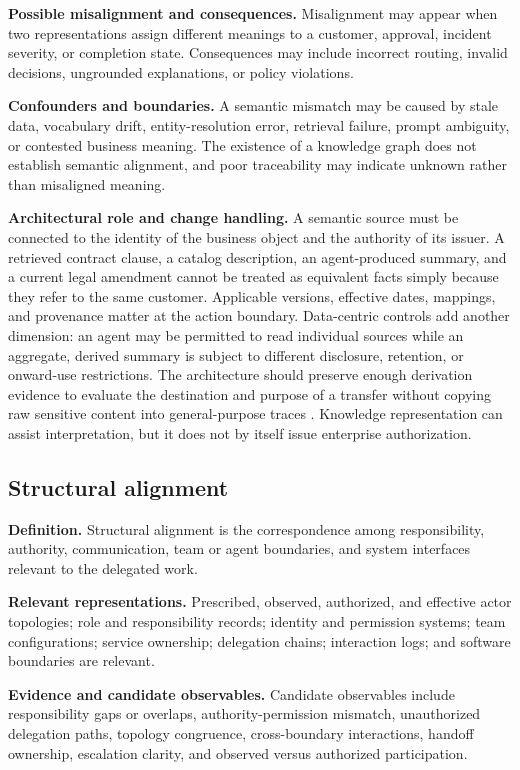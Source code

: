 \documentclass[11pt,letterpaper]{article}
\newcommand{\parencite}[1]{\citep{#1}}
\begin{document}
\textbf{Possible misalignment and consequences.} Misalignment may appear when two representations assign different meanings to a customer, approval, incident severity, or completion state. Consequences may include incorrect routing, invalid decisions, ungrounded explanations, or policy violations.

\textbf{Confounders and boundaries.} A semantic mismatch may be caused by stale data, vocabulary drift, entity-resolution error, retrieval failure, prompt ambiguity, or contested business meaning. The existence of a knowledge graph does not establish semantic alignment, and poor traceability may indicate unknown rather than misaligned meaning.

\textbf{Architectural role and change handling.} A semantic source must be connected to the identity of the business object and the authority of its issuer. A retrieved contract clause, a catalog description, an agent-produced summary, and a current legal amendment cannot be treated as equivalent facts simply because they refer to the same customer. Applicable versions, effective dates, mappings, and provenance matter at the action boundary. Data-centric controls add another dimension: an agent may be permitted to read individual sources while an aggregate, derived summary is subject to different disclosure, retention, or onward-use restrictions. The architecture should preserve enough derivation evidence to evaluate the destination and purpose of a transfer without copying raw sensitive content into general-purpose traces \parencite{w3c2013prov,tallam2026authorization}. Knowledge representation can assist interpretation, but it does not by itself issue enterprise authorization.

\subsection{Structural alignment}
\textbf{Definition.} Structural alignment is the correspondence among responsibility, authority, communication, team or agent boundaries, and system interfaces relevant to the delegated work.

\textbf{Relevant representations.} Prescribed, observed, authorized, and effective actor topologies; role and responsibility records; identity and permission systems; team configurations; service ownership; delegation chains; interaction logs; and software boundaries are relevant.

\textbf{Evidence and candidate observables.} Candidate observables include responsibility gaps or overlaps, authority-permission mismatch, unauthorized delegation paths, topology congruence, cross-boundary interactions, handoff ownership, escalation clarity, and observed versus authorized participation.
\end{document}
